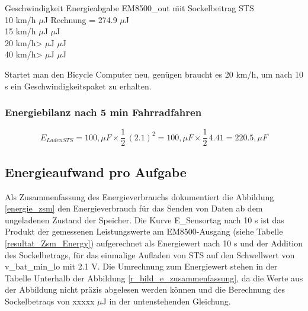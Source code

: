 \begin{minipage}{\textwidth}
    \begin{tabbing}
        Geschwindigkeit \quad\= Energieabgabe EM8500\_out  \quad\= mit Sockelbeitrag STS\\[0.8ex]
        10 km/h         $\mu$J        \> Rechnung = 274.9  $\mu$J\\
        15 km/h        $\mu$J          $\mu$J\\
        20 km/h>       $\mu$J          $\mu$J\\
        40 km/h>      $\mu$J         $\mu$J\\
    \end{tabbing}
\end{minipage} 

Startet man den Bicycle Computer neu, genügen braucht es 20 km/h, um nach 10 s ein Geschwindigkeitspaket zu erhalten. 

\subsubsection{Energiebilanz nach 5 min Fahrradfahren}

\begin{equation}
  E_{Laden STS}= 100, \mu F \times \frac{1}{2}\, (2.1)^2 = 100, \mu F \times \frac{1}{2}\, 4.41 = 220.5, \mu F
\end{equation}



\subsection{Energieaufwand pro Aufgabe}

Als Zusammenfassung des Energieverbrauchs dokumentiert die Abbildung \ref{energie_zsm} den Energieverbrauch für das Senden von Daten ab dem ungeladenen Zustand der Speicher. Die Kurve E\_Sensortag nach 10 s ist das Produkt der gemessenen Leistungswerte am EM8500-Ausgang (siehe Tabelle \ref{resultat_Zsm_Energy}) aufgerechnet als Energiewert nach 10 s und der Addition des Sockelbetrags, für das einmalige Aufladen von STS auf den Schwellwert von v\_bat\_min\_lo mit 2.1 V. Die Umrechnung zum Energiewert stehen in der Tabelle Unterhalb der Abbildung \ref{r_bild_e_zusammenfassung}, da die Werte aus der Abbildung nicht präzis abgelesen werden können und die Berechnung des Sockelbetraqs von xxxxx $\mu$J in der untenstehenden Gleichung.

